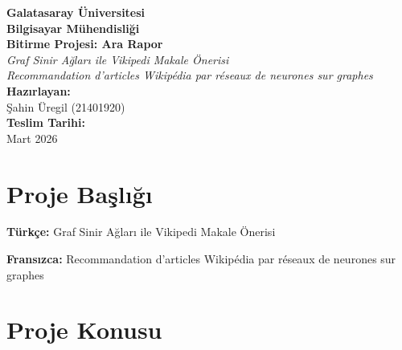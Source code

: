 \documentclass[12pt, a4paper]{article}
\begin{document}
\begin{titlepage}
    \centering
    \vspace*{1cm}
    \Huge
    \textbf{Galatasaray Üniversitesi} \\
    \Large
    \textbf{Bilgisayar Mühendisliği} \\
    \vspace{2cm}
    \Huge
    \textbf{Bitirme Projesi: Ara Rapor} \\
    \vspace{1cm}
    \Large
    \textit{Graf Sinir Ağları ile Vikipedi Makale Önerisi} \\
    \vspace{0.5cm}
    \large
    \textit{Recommandation d'articles Wikipédia par réseaux de neurones sur graphes} \\
    \vspace{3cm}
    \textbf{Hazırlayan:} \\
    Şahin Üregil (21401920) \\
    \vspace{1cm}
    \textbf{Teslim Tarihi:} \\
    Mart 2026 \\
    \vspace*{\fill}
\end{titlepage}

\tableofcontents
\newpage

\section{Proje Başlığı}

\textbf{Türkçe:} Graf Sinir Ağları ile Vikipedi Makale Önerisi

\textbf{Fransızca:} Recommandation d'articles Wikipédia par réseaux de neurones sur graphes

\section{Proje Konusu}
\end{document}
